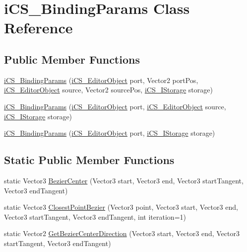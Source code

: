 \hypertarget{classi_c_s___binding_params}{\section{i\+C\+S\+\_\+\+Binding\+Params Class Reference}
\label{classi_c_s___binding_params}
}
\subsection*{Public Member Functions}
\begin{DoxyCompactItemize}
\item 
\hyperlink{classi_c_s___binding_params_a28b79001f4bf89395798b3b116d33d0c}{i\+C\+S\+\_\+\+Binding\+Params} (\hyperlink{classi_c_s___editor_object}{i\+C\+S\+\_\+\+Editor\+Object} port, Vector2 port\+Pos, \hyperlink{classi_c_s___editor_object}{i\+C\+S\+\_\+\+Editor\+Object} source, Vector2 source\+Pos, \hyperlink{classi_c_s___i_storage}{i\+C\+S\+\_\+\+I\+Storage} storage)
\item 
\hyperlink{classi_c_s___binding_params_a2a5277c67893742a6d221f5d786662dd}{i\+C\+S\+\_\+\+Binding\+Params} (\hyperlink{classi_c_s___editor_object}{i\+C\+S\+\_\+\+Editor\+Object} port, \hyperlink{classi_c_s___editor_object}{i\+C\+S\+\_\+\+Editor\+Object} source, \hyperlink{classi_c_s___i_storage}{i\+C\+S\+\_\+\+I\+Storage} storage)
\item 
\hyperlink{classi_c_s___binding_params_ab934ef854e7a64d52bb6bca577387cdc}{i\+C\+S\+\_\+\+Binding\+Params} (\hyperlink{classi_c_s___editor_object}{i\+C\+S\+\_\+\+Editor\+Object} port, \hyperlink{classi_c_s___i_storage}{i\+C\+S\+\_\+\+I\+Storage} storage)
\end{DoxyCompactItemize}
\subsection*{Static Public Member Functions}
\begin{DoxyCompactItemize}
\item 
static Vector3 \hyperlink{classi_c_s___binding_params_a2ac17939af1006a909dcf59d86290777}{Bezier\+Center} (Vector3 start, Vector3 end, Vector3 start\+Tangent, Vector3 end\+Tangent)
\item 
static Vector3 \hyperlink{classi_c_s___binding_params_a8846c4d870edf8957d4a828db483942e}{Closest\+Point\+Bezier} (Vector3 point, Vector3 start, Vector3 end, Vector3 start\+Tangent, Vector3 end\+Tangent, int iteration=1)
\item 
static Vector2 \hyperlink{classi_c_s___binding_params_ab006d8f4baa1368f25a9c16ce074986e}{Get\+Bezier\+Center\+Direction} (Vector3 start, Vector3 end, Vector3 start\+Tangent, Vector3 end\+Tangent)
\end{DoxyCompactItemize}
